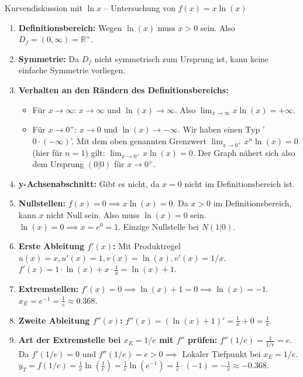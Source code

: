 \begin{beispielumgebung}{Kurvendiskussion mit \texorpdfstring{$\ln x$}{ln(x)} – Untersuchung von \texorpdfstring{$f(x) = x \ln(x)$}{f(x) = x ln(x)}}
\begin{enumerate}
    \item \textbf{Definitionsbereich:} Wegen $\ln(x)$ muss $x>0$ sein. Also $D_f = (0, \infty) = \mathbb{R}^+$.
    \item \textbf{Symmetrie:} Da $D_f$ nicht symmetrisch zum Ursprung ist, kann keine einfache Symmetrie vorliegen.
    \item \textbf{Verhalten an den Rändern des Definitionsbereichs:}
        \begin{itemize}
            \item Für $x \to \infty$: $x \to \infty$ und $\ln(x) \to \infty$. Also $\lim_{x \to \infty} x \ln(x) = +\infty$.
            \item Für $x \to 0^+$: $x \to 0$ und $\ln(x) \to -\infty$. Wir haben einen Typ '$0 \cdot (-\infty)$'.
            Mit dem oben genannten Grenzwert $\lim_{x \to 0^+} x^n \ln(x) = 0$ (hier für $n=1$) gilt:
            $\lim_{x \to 0^+} x \ln(x) = 0$.
            Der Graph nähert sich also dem Ursprung $(0|0)$ für $x \to 0^+$.
        \end{itemize}
    \item \textbf{y-Achsenabschnitt:} Gibt es nicht, da $x=0$ nicht im Definitionsbereich ist.
    \item \textbf{Nullstellen:} $f(x)=0 \implies x \ln(x) = 0$.
        Da $x>0$ im Definitionsbereich, kann $x$ nicht Null sein. Also muss $\ln(x)=0$ sein.
        $\ln(x)=0 \implies x = e^0 = 1$.
        Einzige Nullstelle bei $N(1|0)$.
    \item \textbf{Erste Ableitung $f'(x)$:} Mit Produktregel $u(x)=x, u'(x)=1, v(x)=\ln(x), v'(x)=1/x$.
        $f'(x) = 1 \cdot \ln(x) + x \cdot \frac{1}{x} = \ln(x) + 1$.
    \item \textbf{Extremstellen:} $f'(x)=0 \implies \ln(x) + 1 = 0 \implies \ln(x) = -1$.
        $x_E = e^{-1} = \frac{1}{e} \approx 0.368$.
    \item \textbf{Zweite Ableitung $f''(x)$:} $f''(x) = (\ln(x)+1)' = \frac{1}{x} + 0 = \frac{1}{x}$.
    \item \textbf{Art der Extremstelle bei $x_E=1/e$ mit $f''$ prüfen:}
        $f''(1/e) = \frac{1}{1/e} = e$.
        Da $f'(1/e)=0$ und $f''(1/e)=e > 0 \implies$ Lokaler Tiefpunkt bei $x_E=1/e$.
        $y_T = f(1/e) = \frac{1}{e} \ln(\frac{1}{e}) = \frac{1}{e} \ln(e^{-1}) = \frac{1}{e} \cdot (-1) = -\frac{1}{e} \approx -0.368$.

\end{enumerate}
\end{beispielumgebung}
